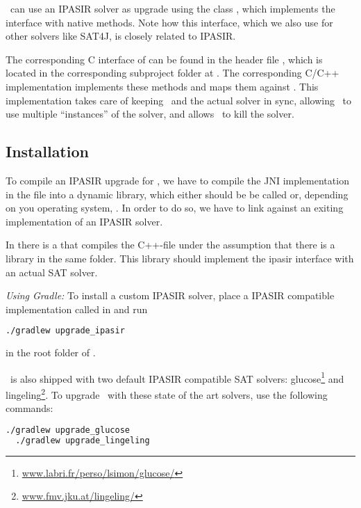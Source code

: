 \documentclass[a4paper, ukenglish, twoside, openright]{jdrasilmanual}
\begin{document}
\Jdrasil\ can use an IPASIR solver as upgrade using the class
, which implements the interface
 with native methods. Note how this
interface, which we also use for other solvers like SAT4J, is closely
related to IPASIR. 

The corresponding C interface of  can be found
in the header file , which is
located in the corresponding subproject folder at . The
corresponding C/C++ implementation
 implements these methods and
maps them against . This implementation takes care of
keeping \Jdrasil\ and the actual solver in sync, allowing \Jdrasil\ to
use multiple ``instances'' of the solver, and allows \Jdrasil\ to kill
the solver. 

\subsection{Installation} 
To compile an IPASIR upgrade for \Jdrasil, we have to compile the JNI
implementation in the file 
into a dynamic library, which either should be be called
 or, depending on you
operating system,
. In order to do so, we
have to link against an exiting implementation of an IPASIR solver.

In  there is a  that
compiles the C++-file under the assumption that there is a library
 in the same folder. This library should
implement the ipasir interface with an actual SAT solver.

\emph{Using Gradle:} To install a custom IPASIR solver, place a IPASIR compatible
implementation called  in
 and run
\begin{lstlisting}[language=bash]
  ./gradlew upgrade_ipasir
\end{lstlisting}
in the root folder of \Jdrasil.

\Jdrasil\ is also shipped with two default IPASIR compatible SAT solvers:
glucose\footnote{\url{www.labri.fr/perso/lsimon/glucose/}} and lingeling\footnote{\url{www.fmv.jku.at/lingeling/}}. To upgrade \Jdrasil\ with these state of the
art solvers, use the following commands:
\begin{lstlisting}[language=bash]
  ./gradlew upgrade_glucose
  ./gradlew upgrade_lingeling
\end{lstlisting}
\end{document}

